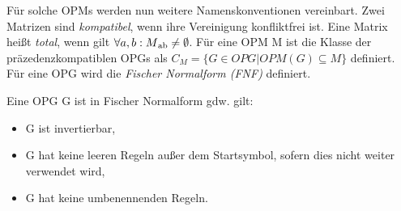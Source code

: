 Für solche OPMs werden nun weitere Namenskonventionen vereinbart. Zwei Matrizen sind \textit{kompatibel}, wenn ihre Vereinigung konfliktfrei ist. Eine Matrix heißt \textit{total}, wenn gilt $\forall a, b: M \textsubscript{ab} \neq \emptyset$. Für eine OPM M ist die Klasse der präzedenzkompatiblen OPGs als $C_M=\{G \in OPG | OPM(G) \subseteq M\}$ definiert. 
Für eine OPG wird die \textit{Fischer Normalform (FNF)} definiert.

\begin{definition}[Fischernormalform]
Eine OPG G ist in Fischer Normalform gdw. gilt:
\begin{itemize}
\item
G ist invertierbar,
\item
G hat keine leeren Regeln außer dem Startsymbol, sofern dies nicht weiter verwendet wird,
\item 
G hat keine umbenennenden Regeln.
\end{itemize}
\end{definition}

